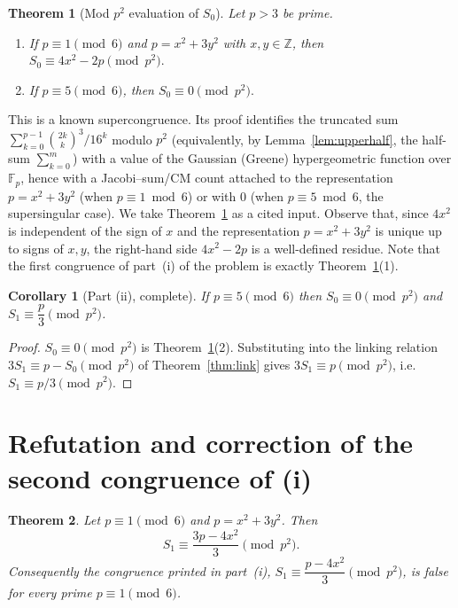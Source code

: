\documentclass[12pt]{article}
\newtheorem{theorem}{Theorem}
\newtheorem{corollary}{Corollary}
\theoremstyle{remark}
\begin{document}
\begin{theorem}[Mod $p^2$ evaluation of $S_0$]\label{thm:S0}
Let $p>3$ be prime.
\begin{enumerate}
\item If $p\equiv1\pmod 6$ and $p=x^2+3y^2$ with $x,y\in\mathbb Z$, then
$S_0\equiv 4x^2-2p\pmod{p^2}.$
\item If $p\equiv5\pmod 6$, then $S_0\equiv 0\pmod{p^2}.$
\end{enumerate}
\end{theorem}

This is a known supercongruence.  Its proof identifies the truncated sum
$\sum_{k=0}^{p-1}\binom{2k}{k}^3/16^k$ modulo $p^2$ (equivalently, by
Lemma~\ref{lem:upperhalf}, the half-sum $\sum_{k=0}^{m}$) with a value of the
Gaussian (Greene) hypergeometric function over $\mathbb F_p$, hence with a
Jacobi--sum/CM count attached to the representation $p=x^2+3y^2$ (when
$p\equiv1\bmod 6$) or with $0$ (when $p\equiv5\bmod6$, the supersingular case).
We take Theorem~\ref{thm:S0} as a cited input.  Observe that, since $4x^2$ is
independent of the sign of $x$ and the representation $p=x^2+3y^2$ is unique up
to signs of $x,y$, the right-hand side $4x^2-2p$ is a well-defined residue.
Note that the first congruence of part~(i) of the problem is exactly
Theorem~\ref{thm:S0}(1).

\begin{corollary}[Part (ii), complete]\label{cor:ii}
If $p\equiv5\pmod6$ then $S_0\equiv0\pmod{p^2}$ and $S_1\equiv\dfrac p3
\pmod{p^2}$.
\end{corollary}

\begin{proof}
$S_0\equiv0\pmod{p^2}$ is Theorem~\ref{thm:S0}(2).  Substituting into the
linking relation $3S_1\equiv p-S_0\pmod{p^2}$ of Theorem~\ref{thm:link} gives
$3S_1\equiv p\pmod{p^2}$, i.e.\ $S_1\equiv p/3\pmod{p^2}$.
\end{proof}

\section{Refutation and correction of the second congruence of (i)}

\begin{theorem}\label{thm:i2}
Let $p\equiv1\pmod6$ and $p=x^2+3y^2$.  Then
\begin{equation}\label{eq:i2correct}
S_1\equiv\frac{3p-4x^2}{3}\pmod{p^2}.
\end{equation}
Consequently the congruence printed in part~(i),
$S_1\equiv\dfrac{p-4x^2}{3}\pmod{p^2}$, is \emph{false} for every prime
$p\equiv1\pmod6$.
\end{theorem}
\end{document}

